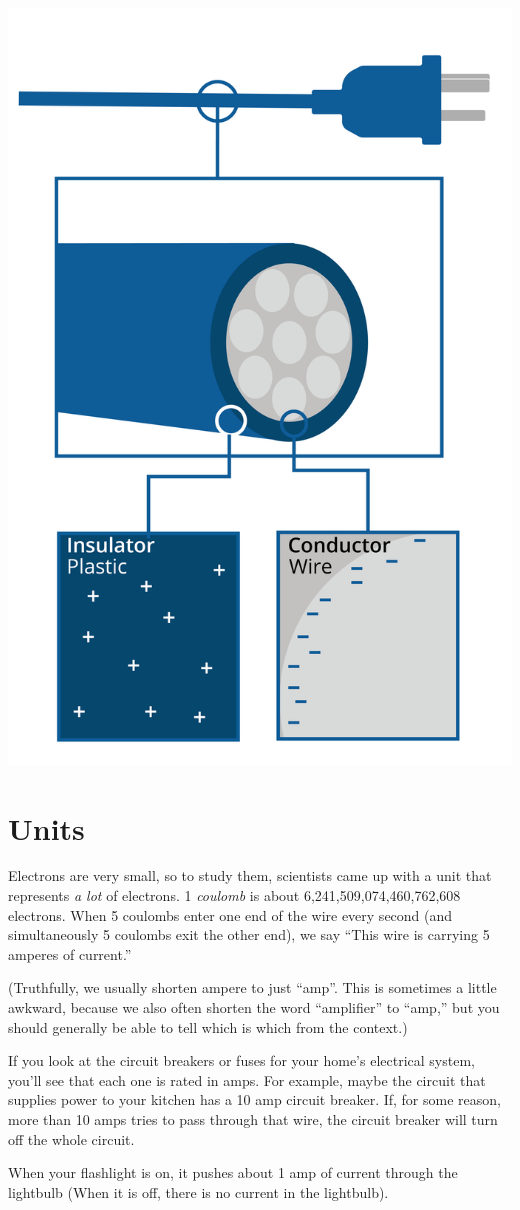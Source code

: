 \includegraphics[width=.5\textwidth]{plug.png}


\section{Units}

Electrons are very small, so to study them, scientists came up with a
unit that represents \textit{a lot} of electrons. 1 \textit{coulomb}
is about 6,241,509,074,460,762,608 electrons. When 5 coulombs enter one end of the wire every second (and simultaneously 5 coulombs exit the other end), we say ``This wire is carrying 5 amperes of current.''

(Truthfully, we usually shorten ampere to just ``amp''.  This is
sometimes a little awkward, because we also often shorten the word
``amplifier'' to ``amp,'' but you should generally be able to tell which is which
from the context.)

If you look at the circuit breakers or fuses for your home's
electrical system, you'll see that each one is rated in amps. For
example, maybe the circuit that supplies power to your kitchen has a 10
amp circuit breaker. If, for some reason, more than 10 amps tries to
pass through that wire, the circuit breaker will turn off the whole
circuit.

When your flashlight is on, it pushes about 1 amp of current
through the lightbulb (When it is off, there is no current in the
lightbulb).

